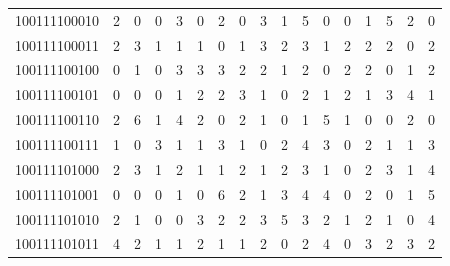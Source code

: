 \documentclass[10pt,a4paper]{article}
\begin{document}
\begin{longtable}{ |c|c|c|c|c|c|c|c|c|c|c|c|c|c|c|c|c| }
    100111100010              & 2                            & 0                                & 0                            & 3                              & 0   & 2   & 0   & 3   & 1   & 5   & 0   & 0   & 1   & 5   & 2   & 0   \\
    100111100011              & 2                            & 3                                & 1                            & 1                              & 1   & 0   & 1   & 3   & 2   & 3   & 1   & 2   & 2   & 2   & 0   & 2   \\
    100111100100              & 0                            & 1                                & 0                            & 3                              & 3   & 3   & 2   & 2   & 1   & 2   & 0   & 2   & 2   & 0   & 1   & 2   \\
    100111100101              & 0                            & 0                                & 0                            & 1                              & 2   & 2   & 3   & 1   & 0   & 2   & 1   & 2   & 1   & 3   & 4   & 1   \\
    100111100110              & 2                            & 6                                & 1                            & 4                              & 2   & 0   & 2   & 1   & 0   & 1   & 5   & 1   & 0   & 0   & 2   & 0   \\
    100111100111              & 1                            & 0                                & 3                            & 1                              & 1   & 3   & 1   & 0   & 2   & 4   & 3   & 0   & 2   & 1   & 1   & 3   \\
    100111101000              & 2                            & 3                                & 1                            & 2                              & 1   & 1   & 2   & 1   & 2   & 3   & 1   & 0   & 2   & 3   & 1   & 4   \\
    100111101001              & 0                            & 0                                & 0                            & 1                              & 0   & 6   & 2   & 1   & 3   & 4   & 4   & 0   & 2   & 0   & 1   & 5   \\
    100111101010              & 2                            & 1                                & 0                            & 0                              & 3   & 2   & 2   & 3   & 5   & 3   & 2   & 1   & 2   & 1   & 0   & 4   \\
    100111101011              & 4                            & 2                                & 1                            & 1                              & 2   & 1   & 1   & 2   & 0   & 2   & 4   & 0   & 3   & 2   & 3   & 2   \\

\end{longtable}
\end{document}
